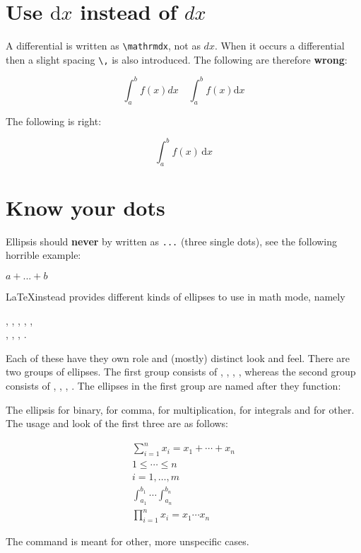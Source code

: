 \documentclass[a4paper, 10pt, abstract=on, headings=standardclasses]{scrartcl}
\begin{document}
\section{Use \texorpdfstring{$\mathrm{d}x$}{dx} instead of \texorpdfstring{$dx$}{dx}}

A differential is written as \texttt{{\textbackslash}mathrm{d}x}, not as $dx$.
When it occurs a differential then a slight spacing \texttt{{\textbackslash},} is also introduced.
The following are therefore \textbf{wrong}:
\begin{LTXexample}[pos = r]
  \[
    \int_a^b f(x) dx
    \quad
    \int_a^b f(x) \mathrm{d}x
  \]
\end{LTXexample}
The following is right:
\begin{LTXexample}[pos = r]
  \[
    \int_a^b f(x) \,\mathrm{d}x
  \]
\end{LTXexample}






\section{Know your dots}
Ellipsis should \textbf{never} by written as \texttt{...} (three single dots), see the following horrible example:
\begin{LTXexample}[pos = r]
  $a + ... + b$
\end{LTXexample}
\LaTeX instead provides different kinds of ellipses to use in math mode, namely
\begin{center}
    ,
    \quad
    ,
    \quad
    ,
    \quad
    ,
    \quad
    ,
    \\
    ,
    \quad
    ,
    \quad
    ,
    \quad
    .
\end{center}
Each of these have they own role and (mostly) distinct look and feel.
There are two groups of ellipses.
The first group consists of , , , , whereas the second group consists of , , , .
The ellipses in the first group are named after they function:

The ellipsis  for binary,  for comma,  for multiplication,  for integrals and  for other.
The usage and look of the first three are as follows:
\begin{LTXexample}[pos = r]
  \begin{gather*}
    \sum_{i=1}^n x_i = x_1 + \dotsb + x_n  \\
    1 \leq \dotsb \leq n  \\
    i = 1, \dotsc, m  \\
    \int_{a_1}^{b_1} \dotsi \int_{a_n}^{b_n} \\
    \prod_{i=1}^n x_i = x_1 \dotsm x_n
  \end{gather*}
\end{LTXexample}
The command  is meant for other, more unspecific cases.
\end{document}
